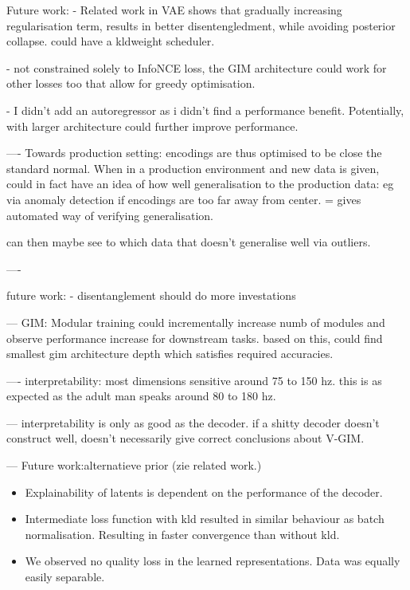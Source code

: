 \documentclass[]{book}
\begin{document}
Future work:
 - Related work in VAE shows that gradually increasing regularisation term, results in better disentengledment, while avoiding posterior collapse. could have a kldweight scheduler.
 
- not constrained solely to InfoNCE loss, the GIM architecture could work for other losses too that allow for greedy optimisation.


- I didn't add an autoregressor as i didn't find a performance benefit. Potentially, with larger architecture could further improve performance.



----
Towards production setting:
	encodings are thus optimised to be close the standard normal. When in a production environment and new data is given, could in fact have an idea of how well generalisation to the production data: eg via anomaly detection if encodings are too far away from center. 
	= gives automated way of verifying generalisation.
	
	can then maybe see to which data that doesn't generalise well via outliers.
	
----


future work:
- disentanglement should do more investations


---
GIM: Modular training
could incrementally increase numb of modules and observe performance increase for downstream tasks.
based on this, could find smallest gim architecture depth which satisfies required accuracies.

----
interpretability:
most dimensions sensitive around 75 to 150 hz. this is as expected as the adult man speaks around 80 to 180 hz.

---
interpretability is only as good as the decoder. if a shitty decoder doesn't construct well, doesn't necessarily give correct conclusions about V-GIM.


---
Future work:alternatieve prior (zie related work.)






\begin{itemize}
	\item Explainability of latents is dependent on the performance of the decoder.
	\item Intermediate loss function with kld resulted in similar behaviour as batch normalisation. Resulting in faster convergence than without kld.
	\item We observed no quality loss in the learned representations. Data was equally easily separable.
\end{itemize}








\end{document}
